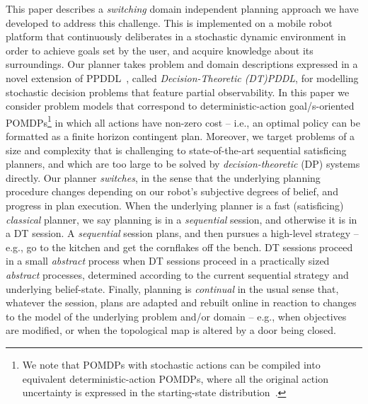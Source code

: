 This paper describes a {\em switching} domain independent planning
approach we have developed to address this challenge. This is
implemented on a mobile robot platform that continuously deliberates
in a stochastic dynamic environment in order to achieve goals set by
the user, and acquire knowledge about its surroundings.
Our planner takes problem and domain descriptions expressed in a novel
extension of PPDDL~\cite{younes:etal:2005}, called {\em
Decision-Theoretic (DT)PDDL}, for modelling stochastic decision
problems that feature partial observability.  In this paper we
consider problem models that correspond to deterministic-action
goal/s-oriented POMDPs\footnote{We note that POMDPs with stochastic
actions can be compiled into equivalent deterministic-action POMDPs,
where all the original action uncertainty is expressed in the
starting-state distribution~\cite{ng:Jordan:2000}.} in which all
actions have non-zero cost -- i.e., an optimal policy can be formatted
as a finite horizon contingent plan. Moreover, we target problems of a
size and complexity that is challenging to state-of-the-art sequential
satisficing planners, and which are too large to be solved by {\em
decision-theoretic} (DP) systems directly. Our planner {\em switches},
in the sense that the underlying planning procedure changes depending
on our robot's subjective degrees of belief, and progress in plan
execution. When the underlying planner is a fast (satisficing) {\em
classical} planner, we say planning is in a {\em sequential} session,
and otherwise it is in a DT session.
A {\em sequential} session plans, and then pursues a high-level
strategy -- e.g., go to the kitchen and get the cornflakes off the
bench. DT sessions proceed in a small {\em abstract} process when 
DT sessions proceed in a practically sized {\em abstract} processes,
determined according to the current sequential strategy and underlying
belief-state.
Finally, planning is {\em continual}
in the usual sense that, whatever the session, plans are adapted and
rebuilt online in reaction to changes to the model of the underlying
problem and/or domain -- e.g., when objectives are modified, or when
the topological map is altered by a door being closed.





